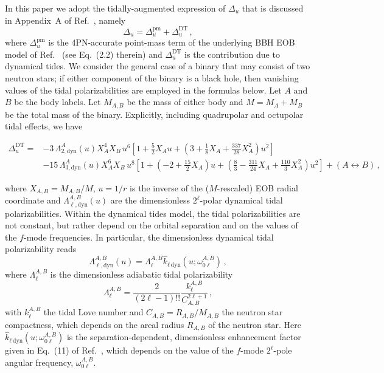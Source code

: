 \documentclass[prd,aps,letter,twocolumn,floatfix,notitlepage]{revtex4-1}
\begin{document}
In this paper we adopt the tidally-augmented expression of $\Delta_u$ that is discussed in Appendix~A of Ref.~\cite{Steinhoff:2016rfi}, namely
\begin{equation}
\Delta_u = \Delta_u^{\textrm{pm}} + \Delta_u^{\textrm{DT}}\,,
\end{equation}
where $\Delta_u^{\textrm{pm}}$ is the 4PN-accurate point-mass term of the underlying BBH EOB model of Ref.~\cite{Bohe:2016gbl} (see Eq.~(2.2) therein) and $\Delta_u^{\textrm{DT}}$ is the contribution due to dynamical tides. We consider the general case of a binary that may consist of two neutron stars; if either component of the binary is a black hole, then vanishing values of the tidal polarizabilities are employed in the formulas below. Let $A$ and $B$ be the body labels. Let $M_{A,B}$ be the mass of either body and $M=M_A+M_B$ be the total mass of the binary.  Explicitly, including quadrupolar and octupolar tidal effects, we have
\begin{widetext}
\begin{align}
 \Delta_u^{\textrm{DT}} =&  - 3\,\Lambda_{2,\textrm{dyn}}^{A}(u)X_A^4 X_B\,u^6  \left[ 1 + \frac{5}{2} X_Au + \left(3 + \frac{1}{8}X_A + \frac{337}{28} X_A^2\right)u^2 \right]\nonumber\\
 &- 15\,\Lambda_{3,\textrm{dyn}}^{A}(u)X_A^6X_B\,u^8 \left[1 + \left(-2 + \frac{15}{2}X_A\right)u + \left(\frac{8}{3} - \frac{311}{24}X_A + \frac{110}{3}X_A^2\right) u^2\right] + (A \leftrightarrow B)\,,
\end{align}
\end{widetext}
where $X_{A,B}=M_{A,B}/M$, $u=1/r$ is the inverse of the ($M$-rescaled) EOB radial coordinate and $\Lambda_{\ell,\textrm{dyn}}^{A,B}(u)$ are the dimensionless $2^{\ell}$-polar dynamical tidal polarizabilities. Within the dynamical tides model, the tidal polarizabilities are not constant, but rather depend on the orbital separation and on the values of the $f$-mode frequencies. In particular, the dimensionless dynamical tidal polarizability reads
\begin{equation}
\Lambda_{\ell,\textrm{dyn}}^{A,B}(u)=\Lambda_{\ell}^{A,B}\hat{k}_{\ell\,\textrm{dyn}}(u;\omega_{0\ell}^{A,B})\,,
\end{equation}
where $\Lambda_{\ell}^{A,B}$ is the dimensionless adiabatic tidal polarizability
\begin{equation}
\Lambda_{\ell}^{A,B}=\frac{2}{(2\ell-1)!!}\frac{k^{A,B}_{\ell}}{C_{A,B}^{2\ell+1}}\,,
\end{equation}
with $k^{A,B}_{\ell}$ the tidal Love number and $C_{A,B}=R_{A,B}/M_{A,B}$ the neutron star compactness, which depends on the areal radius $R_{A,B}$ of the neutron star. Here $\hat{k}_{\ell\,\textrm{dyn}}(u;\omega_{0\ell}^{A,B})$ is the separation-dependent, dimensionless enhancement factor given in Eq.~(11) of Ref.~\cite{Dietrich:2017feu}, which depends on the value of the $f$-mode $2^\ell$-pole angular frequency, $\omega_{0\ell}^{A,B}$. 
\end{document}
